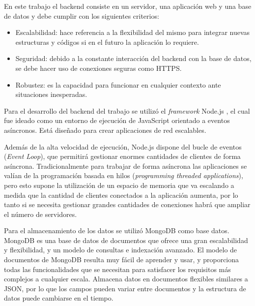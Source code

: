 En este trabajo el backend consiste en un servidor, una aplicación web y una base de datos y debe cumplir con los siguientes criterios:

\begin{itemize}
	\item Escalabilidad: hace referencia a la flexibilidad del mismo para integrar nuevas estructuras y códigos si en el futuro la aplicación lo requiere.
	
	\item Seguridad: debido a la constante interacción del backend con la base de datos, se debe hacer uso de conexiones seguras como HTTPS.
	
	\item Robustez: es la capacidad para funcionar en cualquier contexto ante situaciones inesperadas.
	
\end{itemize}

Para el desarrollo del backend del trabajo se utilizó el \textit{framework} Node.js \citep{WEBSITE:19} ,  el cual fue ideado como un entorno de ejecución de JavaScript orientado a eventos asíncronos. Está diseñado para crear aplicaciones de red escalables.

Además de la alta velocidad de ejecución, Node.js dispone del bucle de eventos (\textit{Event Loop}), que permitirá gestionar enormes cantidades de clientes de forma asíncrona. Tradicionalmente para trabajar de forma asíncrona las aplicaciones se valían de la programación basada en hilos (\textit{programming threaded applications}), pero esto supone la utilización de un espacio de memoria que va escalando a medida que la cantidad de clientes conectados a la aplicación aumenta, por lo tanto si se necesita gestionar grandes cantidades de conexiones habrá que ampliar el número de servidores.

Para el almacenamiento de los datos se utilizó MongoDB \citep{WEBSITE:20} como base datos.  MongoDB es una base de datos de documentos que ofrece una gran escalabilidad y flexibilidad,  y un modelo de consultas e indexación avanzado. El modelo de documentos de MongoDB resulta muy fácil de aprender y usar, y proporciona todas las funcionalidades que se necesitan para satisfacer los requisitos más complejos a cualquier escala. Almacena datos en documentos flexibles similares a JSON, por lo que los campos pueden variar entre documentos y la estructura de datos puede cambiarse en el tiempo.




